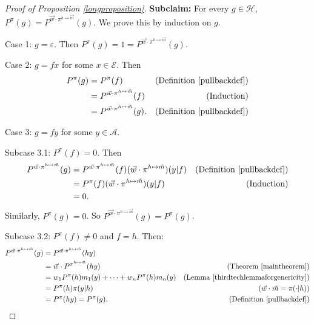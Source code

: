 \documentclass[twoside]{article}
\begin{document}
\begin{proof}[Proof of Proposition \ref{longproposition}]
    \textbf{Subclaim:}
    For every $g\in\mathcal H$,
    $P^\pi(g)=P^{\vec w\cdot\pi^{h\mapsto \vec m}}(g)$.
    We prove this by induction on $g$.

    Case 1: $g=\varepsilon$.
    Then $P^\pi(g)=1
    =P^{\vec w\cdot\pi^{h\mapsto \vec m}}(g)$.

    Case 2: $g=fx$ for some $x\in\mathcal E$.
    Then
    \begin{align*}
        P^\pi(g)
            &= P^\pi(f)
                &\mbox{(Definition \ref{pullbackdef})}\\
            &= P^{\vec w\cdot\pi^{h\mapsto \vec m}}(f)
                &\mbox{(Induction)}\\
            &= P^{\vec w\cdot\pi^{h\mapsto \vec m}}(g).
                &\mbox{(Definition \ref{pullbackdef})}
    \end{align*}

    Case 3: $g=fy$ for some $y\in\mathcal A$.

    Subcase 3.1: $P^\pi(f)=0$.
    Then
    \begin{align*}
        P^{\vec w\cdot\pi^{h\mapsto \vec m}}(g)
            &= P^{\vec w\cdot\pi^{h\mapsto \vec m}}(f)
            (\vec w\cdot\pi^{h\mapsto \vec m})(y|f)
                &\mbox{(Definition \ref{pullbackdef})}\\
            &= P^\pi(f)(\vec w\cdot\pi^{h\mapsto \vec m})(y|f)
                &\mbox{(Induction)}\\
            &= 0.
    \end{align*}
    Similarly, $P^\pi(g)=0$. So $P^{\vec w\cdot\pi^{h\mapsto \vec m}}(g)=P^\pi(g)$.

    Subcase 3.2: $P^\pi(f)\not=0$ and $f=h$. Then:
    \begin{align*}
        P^{\vec w\cdot\pi^{h\mapsto \vec m}}(g)
            &= P^{\vec w\cdot\pi^{h\mapsto \vec m}}(hy)\\
            &= \vec w\cdot{P^{\pi^{h\mapsto \vec m}}}(hy)
                    &\mbox{(Theorem \ref{maintheorem})}\\
            &= w_1P^\pi(h)m_1(y)+\cdots+w_nP^\pi(h)m_n(y)
                    &\mbox{(Lemma \ref{thirdtechlemmaforgenericity})}\\
            &= P^\pi(h)\pi(y|h)
                    &\mbox{($\vec w\cdot\vec m=\pi(\cdot|h)$)}\\
            &= P^\pi(hy) = P^\pi(g).
                    &\mbox{(Definition \ref{pullbackdef})}
    \end{align*}


\end{proof}
\end{document}
